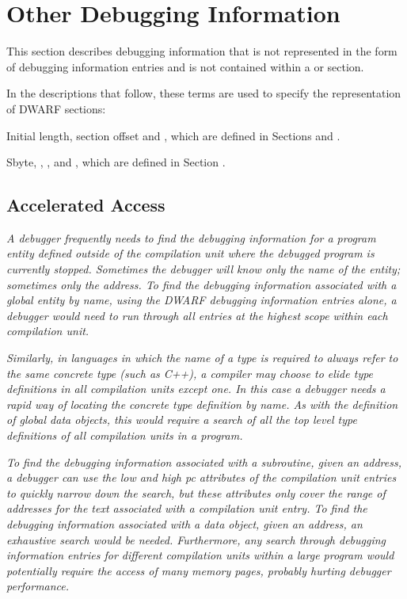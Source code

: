 \chapter{Other Debugging Information}
\label{chap:otherdebugginginformation}
This section describes debugging information that is not
represented in the form of debugging information entries and
is not contained within a  or 
 section.

In the descriptions that follow, these terms are used to
specify the representation of DWARF sections:

Initial length, section offset and 
, which are
defined in 
Sections  and 
.

Sbyte, 
, 
, and 
, 
which 
are defined in 
Section .

\section{Accelerated Access}
\label{chap:acceleratedaccess}

\textit{A debugger frequently needs to find the debugging information
for a program entity defined outside of the compilation unit
where the debugged program is currently stopped. Sometimes the
debugger will know only the name of the entity; sometimes only
the address. To find the debugging information associated with
a global entity by name, using the DWARF debugging information
entries alone, a debugger would need to run through all
entries at the highest scope within each compilation unit.}

\textit{Similarly, in languages in which the name of a type is
required to always refer to the same concrete type (such as
C++), a compiler may choose to elide type definitions in
all compilation units except one. In this case a debugger
needs a rapid way of locating the concrete type definition
by name. As with the definition of global data objects, this
would require a search of all the top level type definitions
of all compilation units in a program.}

\textit{To find the debugging information associated with a subroutine,
given an address, a debugger can use the low and high pc
attributes of the compilation unit entries to quickly narrow
down the search, but these attributes only cover the range
of addresses for the text associated with a compilation unit
entry. To find the debugging information associated with a
data object, given an address, an exhaustive search would be
needed. Furthermore, any search through debugging information
entries for different compilation units within a large program
would potentially require the access of many memory pages,
probably hurting debugger performance.}

